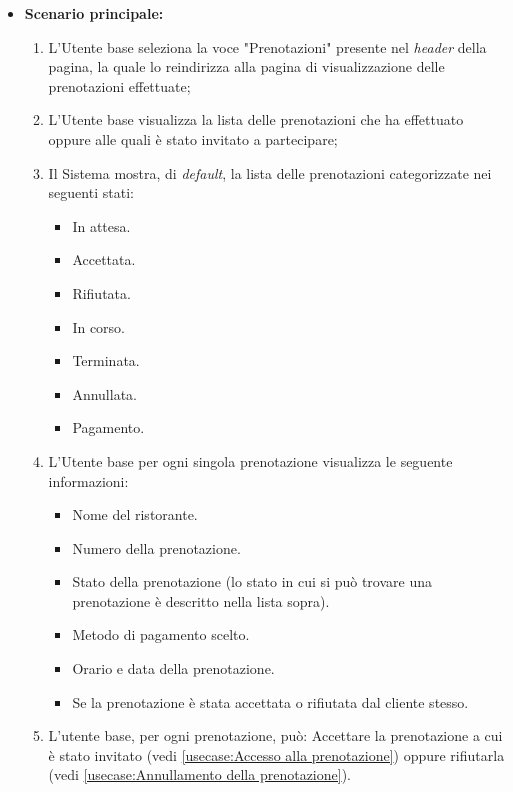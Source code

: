 \begin{itemize}
	\item \textbf{Scenario principale:}
	      \begin{enumerate}
			  \item L'Utente base seleziona la voce "Prenotazioni" presente nel \textit{header} della pagina, la quale lo reindirizza alla pagina di visualizzazione delle prenotazioni effettuate;
		      \item L'Utente base visualizza la lista delle prenotazioni che ha effettuato oppure alle quali è stato invitato a partecipare;
		      \item Il Sistema mostra, di \textit{default}, la lista delle prenotazioni categorizzate nei seguenti stati:
		            \begin{itemize}
			            \item In attesa.
			            \item Accettata.
			            \item Rifiutata.
			            \item In corso.
			            \item Terminata.
			            \item Annullata.
			            \item Pagamento.
		            \end{itemize}
				\item L'Utente base per ogni singola prenotazione visualizza le seguente informazioni:
					\begin{itemize}
						\item Nome del ristorante.
						\item Numero della prenotazione.
						\item Stato della prenotazione (lo stato in cui si può trovare una prenotazione è descritto nella lista sopra).
						\item Metodo di pagamento scelto.
						\item Orario e data della prenotazione.
						\item Se la prenotazione è stata accettata o rifiutata dal cliente stesso.
					\end{itemize}
				\item L'utente base, per ogni prenotazione, può: Accettare la prenotazione a cui è stato invitato (vedi \autoref{usecase:Accesso alla prenotazione}) oppure rifiutarla (vedi \autoref{usecase:Annullamento della prenotazione}).
	      \end{enumerate}
\end{itemize}